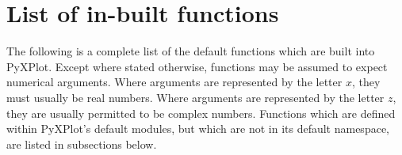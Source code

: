 %
%
%
%
%



\chapter{List of in-built functions}
\label{ch:function_list}

The following is a complete list of the default functions which are built into
PyXPlot. Except where stated otherwise, functions may be assumed to expect
numerical arguments. Where arguments are represented by the letter $x$, they
must usually be real numbers. Where arguments are represented by the letter
$z$, they are usually permitted to be complex numbers.  Functions which are
defined within PyXPlot's default modules, but which are not in its default
namespace, are listed in subsections below.

\newcommand{\funcdef}[2]{
\vspace{5mm}
\begin{samepage}
\noindent
{\large \bf #1}
\newline
\noindent
The #1 function #2
\indfun{#1}
\end{samepage}

}

